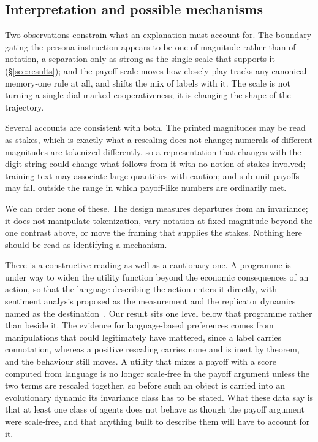 \documentclass[11pt,a4paper]{article}
\begin{document}
\subsection{Interpretation and possible mechanisms}

Two observations constrain what an explanation must account for. The boundary
gating the persona instruction appears to be one of magnitude rather than of
notation, a separation only as strong as the single scale that supports it
(\S\ref{sec:results}); and the payoff scale moves how closely play tracks any
canonical memory-one rule at all, and shifts the mix of labels with it. The
scale is not turning a single dial marked cooperativeness; it is changing the
shape of the trajectory.

Several accounts are consistent with both. The printed magnitudes may be read as
stakes, which is exactly what a rescaling does not change; numerals of different
magnitudes are tokenized differently, so a representation that changes with the
digit string could change what follows from it with no notion of stakes
involved; training text may associate large quantities with caution; and
sub-unit payoffs may fall outside the range in which payoff-like numbers are
ordinarily met.

We can order none of these. The design measures departures from an invariance;
it does not manipulate tokenization, vary notation at fixed magnitude beyond
the one contrast above, or move the framing that supplies the stakes. Nothing
here should be read as identifying a mechanism.

There is a constructive reading as well as a cautionary one. A programme is
under way to widen the utility function beyond the economic consequences of an
action, so that the language describing the action enters it directly, with
sentiment analysis proposed as the measurement and the replicator dynamics named
as the destination~\citep{capraro2024language}. Our result sits one level below
that programme rather than beside it. The evidence for language-based
preferences comes from manipulations that could legitimately have mattered,
since a label carries connotation, whereas a positive rescaling carries none and
is inert by theorem, and the behaviour still moves. A utility that mixes a
payoff with a score computed from language is no longer scale-free in the payoff
argument unless the two terms are rescaled together, so before such an object is
carried into an evolutionary dynamic its invariance class has to be stated. What
these data say is that at least one class of agents does not behave as though
the payoff argument were scale-free, and that anything built to describe them
will have to account for it.
\end{document}
